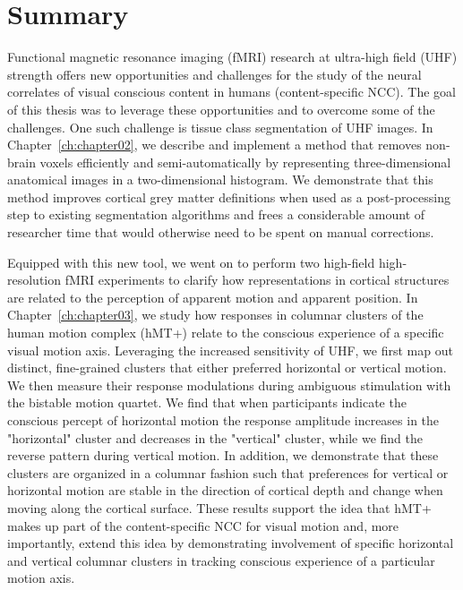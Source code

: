 \chapter{Summary}
Functional magnetic resonance imaging (fMRI) research at ultra-high field (UHF) strength offers new opportunities and challenges for the study of the neural correlates of visual conscious content in humans (content-specific NCC). The goal of this thesis was to leverage these opportunities and to overcome some of the challenges. One such challenge is tissue class segmentation of UHF images. In Chapter~\ref{ch:chapter02}, we describe and implement a method that removes non-brain voxels efficiently and semi-automatically by representing three-dimensional anatomical images in a two-dimensional histogram. We demonstrate that this method improves cortical grey matter definitions when used as a post-processing step to existing segmentation algorithms and frees a considerable amount of researcher time that would otherwise need to be spent on manual corrections. 

Equipped with this new tool, we went on to perform two high-field high-resolution fMRI experiments to clarify how representations in cortical structures are related to the perception of apparent motion and apparent position. In Chapter~\ref{ch:chapter03}, we study how responses in columnar clusters of the human motion complex (hMT+) relate to the conscious experience of a specific visual motion axis. Leveraging the increased sensitivity of UHF, we first map out distinct, fine-grained clusters that either preferred horizontal or vertical motion. We then measure their response modulations during ambiguous stimulation with the bistable motion quartet. We find that when participants indicate the conscious percept of horizontal motion the response amplitude increases in the "horizontal" cluster and decreases in the "vertical" cluster, while we find the reverse pattern during vertical motion. In addition, we demonstrate that these clusters are organized in a columnar fashion such that preferences for vertical or horizontal motion are stable in the direction of cortical depth and change when moving along the cortical surface. These results support the idea that hMT+ makes up part of the content-specific NCC for visual motion and, more importantly, extend this idea by demonstrating involvement of specific horizontal and vertical columnar clusters in tracking conscious experience of a particular motion axis.

